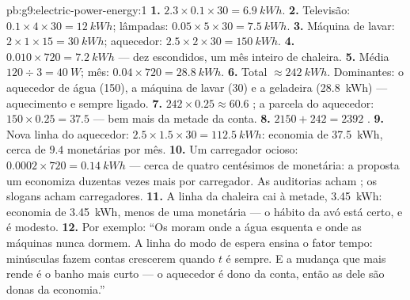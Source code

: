 \begin{solution}{pb:g9:electric-power-energy:1}
\textbf{1.} $2.3 \times 0.1 \times 30 = \qty{6.9}{kWh}$.
\textbf{2.} Televisão: $0.1 \times 4 \times 30 = \qty{12}{kWh}$;
lâmpadas: $0.05 \times 5 \times 30 = \qty{7.5}{kWh}$.
\textbf{3.} Máquina de lavar: $2 \times 1 \times 15 = \qty{30}{kWh}$;
aquecedor: $2.5 \times 2 \times 30 = \qty{150}{kWh}$.
\textbf{4.} $0.010 \times 720 = \qty{7.2}{kWh}$ --- dez 
escondidos, um mês inteiro de chaleira.
\textbf{5.} Média $120 \div 3 = \qty{40}{W}$; mês:
$0.04 \times 720 = \qty{28.8}{kWh}$.
\textbf{6.} Total $\approx \qty{242}{kWh}$. Dominantes: o aquecedor
de água (\qty{150}{}), a máquina de lavar (\qty{30}{}) e a geladeira
(\qty{28.8}{kWh}) --- aquecimento e sempre ligado.
\textbf{7.} $242 \times 0.25 \approx 60.6$ ; a parcela do
aquecedor: $150 \times 0.25 = 37.5$ --- bem mais da metade da conta.
\textbf{8.} $2150 + 242 = 2392$ .
\textbf{9.} Nova linha do aquecedor:
$2.5 \times 1.5 \times 30 = \qty{112.5}{kWh}$: economia de
\qty{37.5}{kWh}, cerca de $9.4$  monetárias por mês.
\textbf{10.} Um carregador ocioso: $0.0002 \times 720 =
\qty{0.14}{kWh}$ --- cerca de quatro centésimos de  monetária:
a proposta um economiza duzentas vezes mais por carregador. As
auditorias acham ; os slogans acham carregadores.
\textbf{11.} A linha da chaleira cai à metade, \qty{3.45}{kWh}:
economia de \qty{3.45}{kWh}, menos de uma  monetária --- o
hábito da avó está certo, e é modesto.
\textbf{12.} Por exemplo: ``Os  moram onde a água
esquenta e onde as máquinas nunca dormem. A linha do modo de espera
ensina o fator tempo:  minúsculas fazem contas crescerem
quando $t$ é sempre. E a mudança que mais rende é o banho mais curto
--- o aquecedor é dono da conta, então as  dele são donas da
economia.''
\end{solution}
